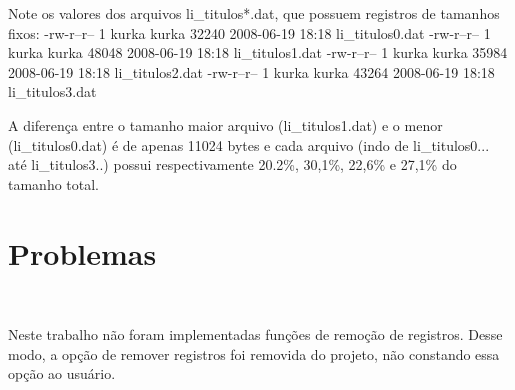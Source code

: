 \documentclass{article}
\begin{document}
Note os valores dos arquivos li_titulos*.dat, que possuem registros de tamanhos fixos:
-rw-r--r-- 1 kurka kurka  32240 2008-06-19 18:18 li_titulos0.dat
-rw-r--r-- 1 kurka kurka  48048 2008-06-19 18:18 li_titulos1.dat
-rw-r--r-- 1 kurka kurka  35984 2008-06-19 18:18 li_titulos2.dat
-rw-r--r-- 1 kurka kurka  43264 2008-06-19 18:18 li_titulos3.dat

A diferença entre o tamanho maior arquivo (li_titulos1.dat) e o menor (li_titulos0.dat) é de apenas 11024 bytes e cada arquivo (indo de li_titulos0... até li_titulos3..) possui respectivamente 20.2\%, 30,1\%, 22,6\% e 27,1\% do tamanho total.


\section{Problemas}\

Neste trabalho não foram implementadas funções de remoção de registros. Desse modo, a opção de remover registros foi removida do projeto, não constando essa opção ao usuário.
\end{document}
